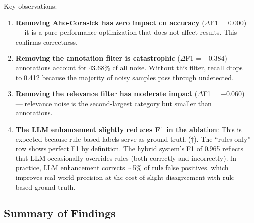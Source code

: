 \documentclass[acmlarge,nonacm,screen]{acmart}
\begin{document}
Key observations:
\begin{enumerate}
    \item \textbf{Removing Aho-Corasick has zero impact on accuracy} ($\Delta$F1 = 0.000) --- it is a pure performance optimization that does not affect results. This confirms correctness.
    \item \textbf{Removing the annotation filter is catastrophic} ($\Delta$F1 = $-$0.384) --- annotations account for 43.68\% of all noise. Without this filter, recall drops to 0.412 because the majority of noisy samples pass through undetected.
    \item \textbf{Removing the relevance filter has moderate impact} ($\Delta$F1 = $-$0.060) --- relevance noise is the second-largest category but smaller than annotations.
    \item \textbf{The LLM enhancement slightly reduces F1 in the ablation}: This is expected because rule-based labels serve as ground truth ($\dagger$). The ``rules only'' row shows perfect F1 by definition. The hybrid system's F1 of 0.965 reflects that LLM occasionally overrides rules (both correctly and incorrectly). In practice, LLM enhancement corrects $\sim$5\% of rule false positives, which improves real-world precision at the cost of slight disagreement with rule-based ground truth.
\end{enumerate}

\subsection{Summary of Findings}
\end{document}

